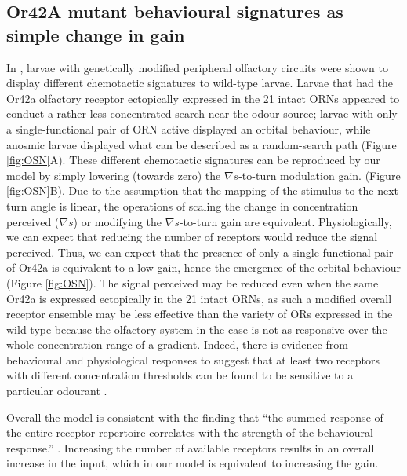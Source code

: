 \documentclass[11pt,a4paper]{article}
\begin{document}
\subsection{Or42A mutant behavioural signatures as simple change in gain}
In \cite{gomez2011active}, larvae with genetically modified peripheral olfactory circuits were shown to display different chemotactic signatures to wild-type larvae.
 Larvae that had the Or42a olfactory receptor ectopically expressed in the 21 intact ORNs appeared to conduct a rather less concentrated search near the odour source; larvae with only a single-functional pair of ORN active displayed an orbital behaviour, while anosmic larvae displayed what can be described as a random-search path (Figure \ref{fig:OSN}A).
 These different chemotactic signatures can be reproduced by our model by simply lowering (towards zero) the $\nabla s$-to-turn modulation gain. 
 (Figure \ref{fig:OSN}B).
 Due to the assumption that the mapping of the stimulus to the next turn angle is linear, the operations of scaling the change in concentration perceived ($\nabla s$) or modifying the $\nabla s$-to-turn gain are equivalent. Physiologically, we can expect that reducing the number of receptors would reduce the signal perceived. Thus, we can expect that the presence of only a single-functional pair of Or42a is equivalent to a low gain, hence the emergence of the orbital behaviour (Figure \ref{fig:OSN}).
 The signal perceived may be reduced even when the same Or42a is expressed ectopically in the 21 intact ORNs, as such a modified overall receptor ensemble may be less effective than the variety of ORs expressed in the wild-type because the olfactory system in the case is not as responsive over the whole concentration range of a gradient. Indeed, there is evidence from behavioural and physiological responses to suggest that at least two receptors with different concentration thresholds can be found to be sensitive to a particular odourant \citep{kreher2008translation}. 

Overall the model is consistent with the finding that ``the summed response of the entire receptor repertoire correlates with the strength of the behavioural response.” \citep{kreher2008translation}. Increasing the number of available receptors results in an overall increase in the input, which in our model is equivalent to increasing the gain.
\end{document}
